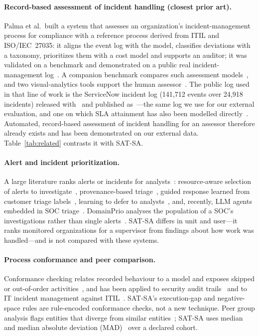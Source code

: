 \paragraph{Record-based assessment of incident handling (closest prior art).}
Palma et al.\ built a system that assesses an organization's incident-management
process for compliance with a reference process derived from ITIL and ISO/IEC~27035:
it aligns the event log with the model, classifies deviations with a taxonomy,
prioritizes them with a cost model and supports an auditor; it was validated on a
benchmark and demonstrated on a public real incident-management log~\cite{palma2024compliance}.
A companion benchmark compares such assessment models~\cite{palma2024benchimp}, and
two visual-analytics tools support the human assessor~\cite{palma2024eurova,palma2025impavid}.
The public log used in that line of work is the ServiceNow incident log (141,712 events
over 24,918 incidents) released with~\cite{amaral2019completion} and published
as~\cite{amaral2018uci498}---the same log we use for our external evaluation, and one
on which SLA attainment has also been modelled directly~\cite{swain2022sla}. Automated,
record-based assessment of incident handling for an assessor therefore already exists
and has been demonstrated on our external data. Table~\ref{tab:related} contrasts it
with SAT-SA.



\paragraph{Alert and incident prioritization.} A large literature ranks alerts or
incidents for analysts~\cite{jalalvand2024prioritisation,tariq2025alertfatigue}:
resource-aware selection of alerts to investigate~\cite{shah2019alertselection},
provenance-based triage~\cite{hassan2019nodoze}, guided response learned from
customer triage labels~\cite{freitas2024guide}, learning to defer to
analysts~\cite{jalalvand2025l2d}, and, recently, LLM agents embedded in SOC
triage~\cite{banstola2026agentic}. DomainPrio analyses the population of a SOC's
investigations rather than single alerts~\cite{chiba2022domainprio}. SAT-SA differs in
unit and user---it ranks monitored organizations for a supervisor from findings about
how work was handled---and is not compared with these systems.

\paragraph{Process conformance and peer comparison.} Conformance checking relates
recorded behaviour to a model and exposes skipped or out-of-order
activities~\cite{rozinat2008conformance,carmona2018conformance,vanderaalst2016pm},
and has been applied to security audit trails~\cite{vanderaalst2005security} and to
IT incident management against ITIL~\cite{ferreira2008itil}. SAT-SA's execution-gap
and negative-space rules are rule-encoded conformance checks, not a new technique.
Peer group analysis flags entities that diverge from similar
entities~\cite{weston2008pga,bolton2002fraud}; SAT-SA uses median and median absolute
deviation (MAD)~\cite{leys2013mad} over a declared cohort.

